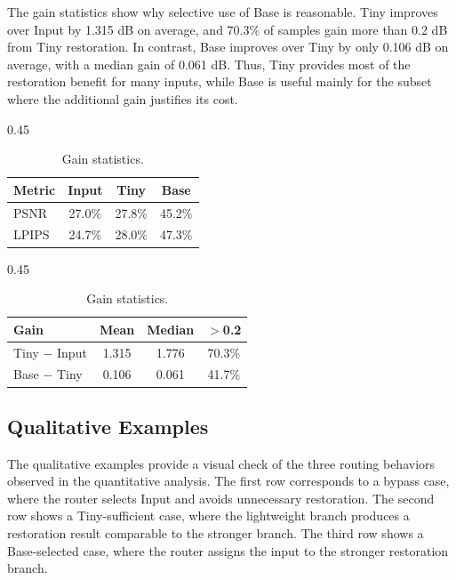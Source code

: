 \documentclass[11pt]{article}
\begin{document}
The gain statistics show why selective use of Base is reasonable.
Tiny improves over Input by 1.315 dB on average, and 70.3\% of samples gain more than 0.2 dB from Tiny restoration.
In contrast, Base improves over Tiny by only 0.106 dB on average, with a median gain of 0.061 dB.
Thus, Tiny provides most of the restoration benefit for many inputs, while Base is useful mainly for the subset where the additional gain justifies its cost.

\begin{table}[H]
\centering
\caption{Branch diversity and gain analysis on the official validation set.}
\label{tab:branch-gain}
\footnotesize
\begin{subtable}{0.45\textwidth}
\centering
\caption{Optimal branch ratio.}
\begin{tabular}{lccc}
\toprule
Metric & Input & Tiny & Base \\
\midrule
PSNR & 27.0\% & 27.8\% & 45.2\% \\
LPIPS & 24.7\% & 28.0\% & 47.3\% \\
\bottomrule
\end{tabular}
\end{subtable}
\hfill
\begin{subtable}{0.45\textwidth}
\centering
\caption{Gain statistics.}
\begin{tabular}{lccc}
\toprule
Gain & Mean & Median & $>$0.2 \\
\midrule
Tiny $-$ Input & 1.315 & 1.776 & 70.3\% \\
Base $-$ Tiny & 0.106 & 0.061 & 41.7\% \\
\bottomrule
\end{tabular}
\end{subtable}
\end{table}

\FloatBarrier

\subsection{Qualitative Examples}

The qualitative examples provide a visual check of the three routing behaviors observed in the quantitative analysis.
The first row corresponds to a bypass case, where the router selects Input and avoids unnecessary restoration.
The second row shows a Tiny-sufficient case, where the lightweight branch produces a restoration result comparable to the stronger branch.
The third row shows a Base-selected case, where the router assigns the input to the stronger restoration branch.
\end{document}
